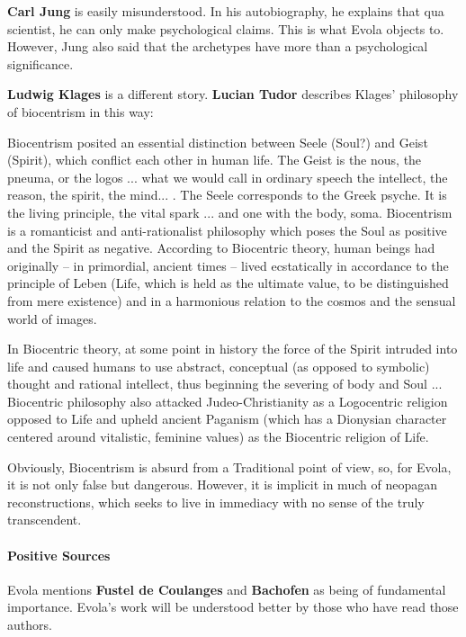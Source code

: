 \textbf{Carl Jung} is easily misunderstood. In his autobiography, he explains that qua scientist, he can only make psychological claims. This is what Evola objects to. However, Jung also said that the archetypes have more than a psychological significance.

\textbf{Ludwig Klages} is a different story. \textbf{Lucian Tudor} describes Klages' philosophy of biocentrism in this way:

\begin{quotex}
Biocentrism posited an essential distinction between Seele (Soul?) and Geist (Spirit), which conflict each other in human life. The Geist is the nous, the pneuma, or the logos ... what we would call in ordinary speech the intellect, the reason, the spirit, the mind... . The Seele corresponds to the Greek psyche. It is the living principle, the vital spark ... and one with the body, soma. Biocentrism is a romanticist and anti-rationalist philosophy which poses the Soul as positive and the Spirit as negative. According to Biocentric theory, human beings had originally -- in primordial, ancient times -- lived ecstatically in accordance to the principle of Leben (Life, which is held as the ultimate value, to be distinguished from mere existence) and in a harmonious relation to the cosmos and the sensual world of images.

In Biocentric theory, at some point in history the force of the Spirit intruded into life and caused humans to use abstract, conceptual (as opposed to symbolic) thought and rational intellect, thus beginning the severing of body and Soul ... Biocentric philosophy also attacked Judeo-Christianity as a Logocentric religion opposed to Life and upheld ancient Paganism (which has a Dionysian character centered around vitalistic, feminine values) as the Biocentric religion of Life.
\end{quotex}


Obviously, Biocentrism is absurd from a Traditional point of view, so, for Evola, it is not only false but dangerous. However, it is implicit in much of neopagan reconstructions, which seeks to live in immediacy with no sense of the truly transcendent.

\paragraph{Positive Sources}


Evola mentions \textbf{Fustel de Coulanges} and \textbf{Bachofen} as being of fundamental importance. Evola's work will be understood better by those who have read those authors.

